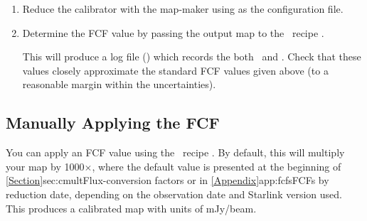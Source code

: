 \begin{enumerate}
\item Reduce the calibrator with the map-maker using
   as the configuration file.

\item Determine the FCF value by passing the output map to the
  \picard\ recipe
  .

\begin{terminalv}
\end{terminalv}

This will produce a log file () which records the
both \fcfb\ and \fcfa. Check that these values closely approximate the
standard FCF values given above (to a reasonable margin within the 
uncertainties).




\end{enumerate}

\subsection{Manually Applying the FCF}
\label{subsec:ApplyingFCF}

You can apply an FCF value using the \picard\ recipe
.
By default, this will multiply your map by 1000$\times$\fcfb, where the default \fcfb
value is presented at the beginning of \cref{Section}{sec:cmult}{Flux-conversion factors}
or in \cref{Appendix}{app:fcfs}{FCFs by reduction date},
depending on the observation date and Starlink version used. This produces a 
calibrated map with units of mJy/beam.

